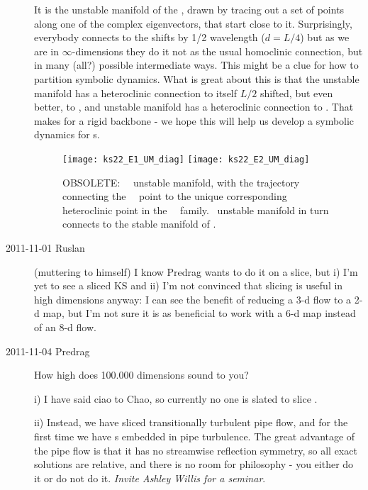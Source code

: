 \begin{description}
 It is the unstable manifold of the 
{\eqv}, drawn by tracing out a set of points along one of the complex
eigenvectors, that start close to it. Surprisingly, everybody connects
to the  shifts by 1/2 wavelength ($d = L/4$) but as we are in
$\infty$-dimensions they do it not as the usual homoclinic connection, but in
many (all?) possible intermediate ways. This might be a clue for how to
partition symbolic dynamics.
What is great about
this is that the  unstable manifold has a heteroclinic connection to itself
$L/2$ shifted, but
even better, to , and  unstable manifold has a heteroclinic
connection to .
That makes for a rigid backbone -
we hope this will help us develop a symbolic dynamics for \rpo s.

\begin{figure} [t]
\begin{center}
\texttt{[image: ks22\_E1\_UM\_diag]}
\texttt{[image: ks22\_E2\_UM\_diag]}
\end{center}
\caption[OBSOLETE: EQV{1}~\eqv\ unstable manifold]
        {OBSOLETE:
~\eqv\ unstable manifold,
    with the trajectory connecting the
~\eqv\ point to the unique corresponding heteroclinic
point in the ~\eqv\ family.
~unstable manifold in turn connects  to the
stable manifold of .
        }
\label{f:KS22cage}
\end{figure}

\item[2011-11-01 Ruslan] (muttering to himself)             \toCB
I know Predrag wants to do it on a slice, but
i) I'm yet to see a sliced KS and
ii) I'm not convinced that slicing is useful in high dimensions anyway:
I can see the benefit of reducing a 3-d flow to a 2-d map, but I'm not
sure it is as beneficial to work with a 6-d map instead of an 8-d flow.

\item[2011-11-04 Predrag]              \toCB
How high does 100.000 dimensions sound to you?

i) I have said ciao to Chao, so currently no one is slated to slice
\KS.

ii) Instead, we have sliced transitionally turbulent pipe flow, and
for the first time we have \rpo s embedded in pipe turbulence. The great
advantage of the pipe flow is that it has no streamwise reflection
symmetry, so all exact solutions are relative, and there is no room for
philosophy - you either do it or do not do it. \emph{Invite Ashley Willis
for a seminar}.


\end{description}
